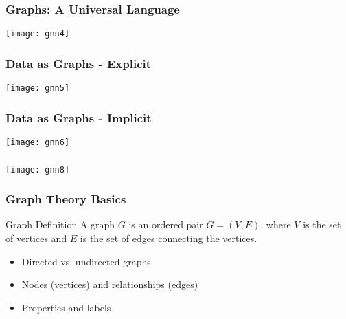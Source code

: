 \begin{frame}[fragile]\frametitle{Graphs: A Universal Language }

\begin{center}
\texttt{[image: gnn4]}
\end{center}	  

\end{frame}


\begin{frame}[fragile]\frametitle{Data as Graphs - Explicit }

\begin{center}
\texttt{[image: gnn5]}
\end{center}	  

\end{frame}

\begin{frame}[fragile]\frametitle{Data as Graphs - Implicit }

\begin{center}
\texttt{[image: gnn6]}
\end{center}	  

\end{frame}



\begin{frame}[fragile]\frametitle{}

\begin{center}
\texttt{[image: gnn8]}
\end{center}	  

\end{frame}

\begin{frame}[fragile]\frametitle{Graph Theory Basics}
  \begin{block}{Graph Definition}
    A graph $G$ is an ordered pair $G = (V, E)$, where $V$ is the set of vertices and $E$ is the set of edges connecting the vertices.
  \end{block}
  
  \begin{itemize}
    \item Directed vs. undirected graphs
    \item Nodes (vertices) and relationships (edges)
    \item Properties and labels
  \end{itemize}
\end{frame}

